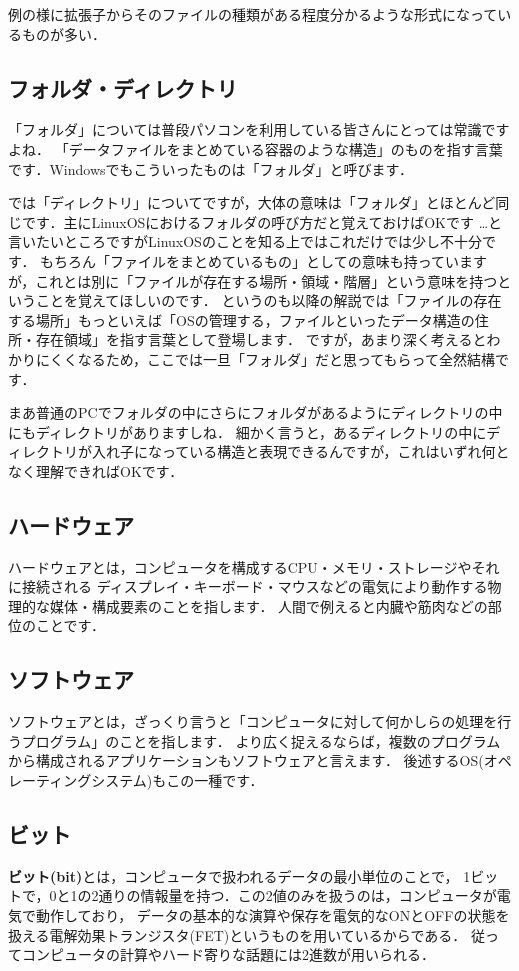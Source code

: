 \documentclass[autodetect-engine,dvi=dvipdfmx,ja=standard,a4j]{bxjsarticle}
\begin{document}
例の様に拡張子からそのファイルの種類がある程度分かるような形式になっているものが多い．

\subsection{フォルダ・ディレクトリ}
「フォルダ」については普段パソコンを利用している皆さんにとっては常識ですよね．
「データファイルをまとめている容器のような構造」のものを指す言葉です．Windowsでもこういったものは「フォルダ」と呼びます．

では「ディレクトリ」についてですが，大体の意味は「フォルダ」とほとんど同じです．主にLinuxOSにおけるフォルダの呼び方だと覚えておけばOKです
{\dots}と言いたいところですがLinuxOSのことを知る上ではこれだけでは少し不十分です．
もちろん「ファイルをまとめているもの」としての意味も持っていますが，これとは別に「ファイルが存在する場所・領域・階層」という意味を持つということを覚えてほしいのです．
というのも以降の解説では「ファイルの存在する場所」もっといえば「OSの管理する，ファイルといったデータ構造の住所・存在領域」を指す言葉として登場します．
ですが，あまり深く考えるとわかりにくくなるため，ここでは一旦「フォルダ」だと思ってもらって全然結構です．

まあ普通のPCでフォルダの中にさらにフォルダがあるようにディレクトリの中にもディレクトリがありますしね．
細かく言うと，あるディレクトリの中にディレクトリが入れ子になっている構造と表現できるんですが，これはいずれ何となく理解できればOKです．

\subsection{ハードウェア}
ハードウェアとは，コンピュータを構成するCPU・メモリ・ストレージやそれに接続される
ディスプレイ・キーボード・マウスなどの電気により動作する物理的な媒体・構成要素のことを指します．
人間で例えると内臓や筋肉などの部位のことです．

\subsection{ソフトウェア}
ソフトウェアとは，ざっくり言うと「コンピュータに対して何かしらの処理を行うプログラム」のことを指します．
より広く捉えるならば，複数のプログラムから構成されるアプリケーションもソフトウェアと言えます．
後述するOS(オペレーティングシステム)もこの一種です．

\subsection{ビット}
\textbf{ビット(bit)}とは，コンピュータで扱われるデータの最小単位のことで，
1ビットで，0と1の2通りの情報量を持つ．この2値のみを扱うのは，コンピュータが電気で動作しており，
データの基本的な演算や保存を電気的なONとOFFの状態を扱える電解効果トランジスタ(FET)というものを用いているからである．
従ってコンピュータの計算やハード寄りな話題には2進数が用いられる．
\end{document}
